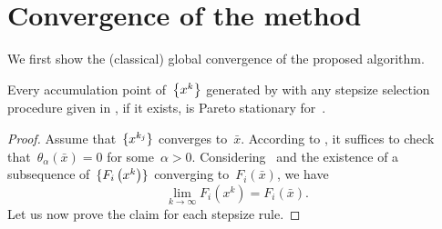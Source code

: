 \documentclass[../main]{subfiles}
\begin{document}
\section{Convergence of the method} 
We first show the (classical) global convergence of the proposed algorithm.
\begin{theorem} 
    Every accumulation point of~$\set*{x^k}$ generated by  with any stepsize selection procedure given in , if it exists, is Pareto stationary for~.
\end{theorem}
\begin{proof}
    Assume that~$\set{x^{k_j}}$ converges to~$\bar{x}$.
    According to , it suffices to check that~$\theta_\alpha(\bar{x}) = 0$ for some~$\alpha > 0$.
    Considering~ and the existence of a subsequence of~$\set{F_i\left(x^k\right)}$ converging to~$F_i(\bar{x})$, we have
    \begin{equation} \label{eq:pgm_stationary:convergence}
        \lim_{k \to \infty} F_i\left(x^k\right) = F_i(\bar{x})
    .\end{equation}
    Let us now prove the claim for each stepsize rule.


\end{proof}
\end{document}
